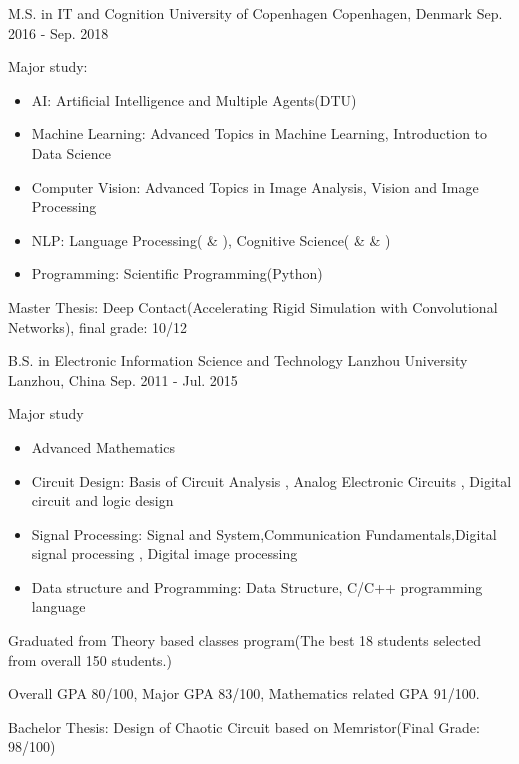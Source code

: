 \begin{cventries}
  \cventry
    {M.S. in IT and Cognition}
    {University of Copenhagen}
    {Copenhagen, Denmark}
    {Sep. 2016 - Sep. 2018}
    {
      \begin{cvitems}
        \item {
            Major study:
            \begin{itemize}
                \item AI: Artificial Intelligence and Multiple Agents(DTU)
                \item Machine Learning: Advanced Topics in Machine Learning,  Introduction to Data Science
                \item Computer Vision: Advanced Topics in Image Analysis, Vision and Image Processing
                \item NLP: Language Processing(\uppercase\expandafter{} \& \uppercase\expandafter{}), Cognitive Science(\uppercase\expandafter{} \& \uppercase\expandafter{} \& \uppercase\expandafter{})
                \item Programming: Scientific Programming(Python)
            \end{itemize}
        }
\item {Master Thesis: Deep Contact(Accelerating Rigid Simulation with Convolutional Networks), final grade: 10/12}
      \end{cvitems}
    }
    \cventry
    {B.S. in Electronic Information Science and Technology}
    {Lanzhou University}
    {Lanzhou, China}
    {Sep. 2011 - Jul. 2015}
    {
      \begin{cvitems}
        \item {
            Major study
            \begin{itemize}
                \item Advanced Mathematics
                \item Circuit Design: Basis of Circuit Analysis , Analog Electronic Circuits , Digital
                circuit and logic design
                \item Signal Processing: Signal and System,Communication Fundamentals,Digital
                signal processing , Digital image processing
                \item Data structure and Programming: Data Structure, C/C++ programming language
            \end{itemize}
        }
        \item {Graduated from Theory based classes program(The best 18 students selected from overall 150 students.)}
        \item {Overall GPA 80/100, Major GPA 83/100, Mathematics related GPA 91/100.}
	\item {Bachelor Thesis: Design of Chaotic Circuit based on Memristor(Final Grade: 98/100)}
      \end{cvitems}
    }
\end{cventries}
